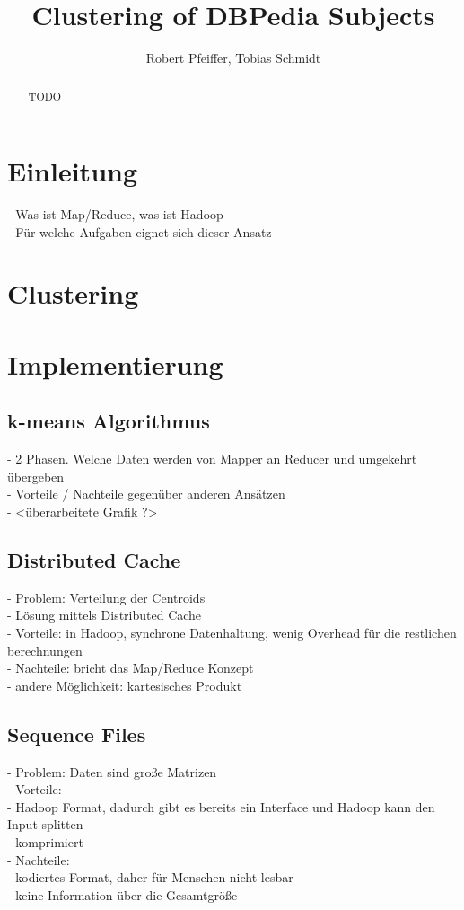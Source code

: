\documentclass[a4paper]{llncs}
\title{Clustering of DBPedia Subjects}
\author{Robert Pfeiffer, Tobias Schmidt}
\institute{Hasso-Plattner-Institut für Softwaresystemtechnik, Potsdam}
\begin{document}
\maketitle
\begin{abstract}
TODO
\end{abstract}

\section{Einleitung}
- Was ist Map/Reduce, was ist Hadoop\\
- Für welche Aufgaben eignet sich dieser Ansatz

\section{Clustering}

\section{Implementierung}

\subsection{k-means Algorithmus}
- 2 Phasen. Welche Daten werden von Mapper an Reducer und umgekehrt übergeben\\
- Vorteile / Nachteile gegenüber anderen Ansätzen\\
- <überarbeitete Grafik ?>

\subsection{Distributed Cache}
- Problem: Verteilung der Centroids\\
- Lösung mittels Distributed Cache\\
- Vorteile: in Hadoop, synchrone Datenhaltung, wenig Overhead für die restlichen berechnungen\\
- Nachteile: bricht das Map/Reduce Konzept\\
- andere Möglichkeit: kartesisches Produkt

\subsection{Sequence Files}
- Problem: Daten sind große Matrizen\\
- Vorteile:\\
    - Hadoop Format, dadurch gibt es bereits ein Interface und Hadoop kann den Input splitten\\
    - komprimiert\\
- Nachteile:\\
    - kodiertes Format, daher für Menschen nicht lesbar\\
    - keine Information über die Gesamtgröße
\end{document}
